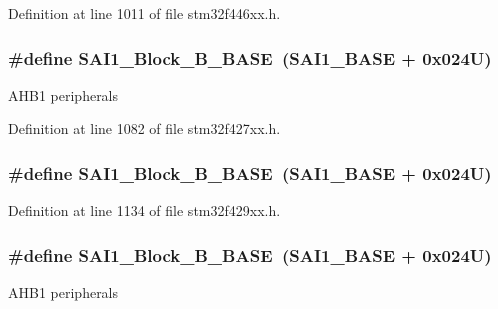 Definition at line 1011 of file stm32f446xx.\+h.

\subsubsection[{\texorpdfstring{S\+A\+I1\+\_\+\+Block\+\_\+\+B\+\_\+\+B\+A\+SE}{SAI1_Block_B_BASE}}]{\setlength{\rightskip}{0pt plus 5cm}\#define S\+A\+I1\+\_\+\+Block\+\_\+\+B\+\_\+\+B\+A\+SE~({\bf S\+A\+I1\+\_\+\+B\+A\+SE} + 0x024\+U)}\hypertarget{group___peripheral__memory__map_gacdb59b321830def8c7a57c154178bc48}{}\label{group___peripheral__memory__map_gacdb59b321830def8c7a57c154178bc48}
A\+H\+B1 peripherals 

Definition at line 1082 of file stm32f427xx.\+h.

\subsubsection[{\texorpdfstring{S\+A\+I1\+\_\+\+Block\+\_\+\+B\+\_\+\+B\+A\+SE}{SAI1_Block_B_BASE}}]{\setlength{\rightskip}{0pt plus 5cm}\#define S\+A\+I1\+\_\+\+Block\+\_\+\+B\+\_\+\+B\+A\+SE~({\bf S\+A\+I1\+\_\+\+B\+A\+SE} + 0x024\+U)}\hypertarget{group___peripheral__memory__map_gacdb59b321830def8c7a57c154178bc48}{}\label{group___peripheral__memory__map_gacdb59b321830def8c7a57c154178bc48}


Definition at line 1134 of file stm32f429xx.\+h.

\subsubsection[{\texorpdfstring{S\+A\+I1\+\_\+\+Block\+\_\+\+B\+\_\+\+B\+A\+SE}{SAI1_Block_B_BASE}}]{\setlength{\rightskip}{0pt plus 5cm}\#define S\+A\+I1\+\_\+\+Block\+\_\+\+B\+\_\+\+B\+A\+SE~({\bf S\+A\+I1\+\_\+\+B\+A\+SE} + 0x024\+U)}\hypertarget{group___peripheral__memory__map_gacdb59b321830def8c7a57c154178bc48}{}\label{group___peripheral__memory__map_gacdb59b321830def8c7a57c154178bc48}
A\+H\+B1 peripherals 


